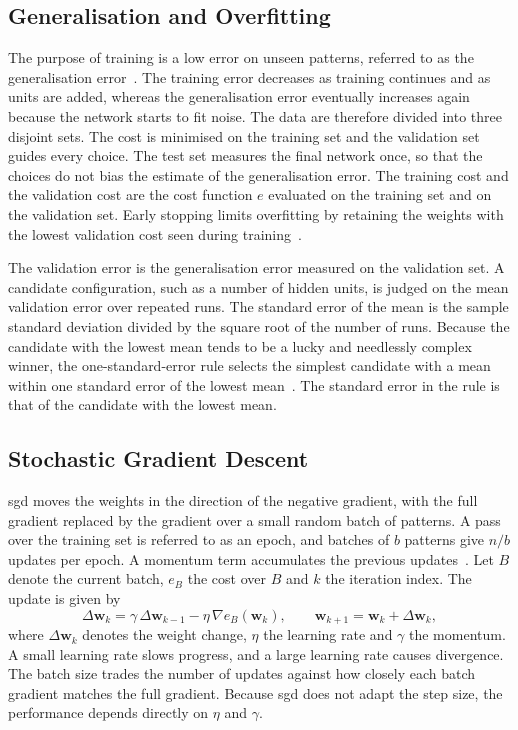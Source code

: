 \documentclass[conference]{IEEEtran}
\newcommand{\vect}[1]{\mathbf{#1}}
\begin{document}
\subsection{Generalisation and Overfitting}

The purpose of training is a low error on unseen patterns, referred to as the
generalisation error~\cite{engelbrecht2007}. The training error decreases as
training continues and as units are added, whereas the generalisation error
eventually increases again because the network starts to fit noise. The data are
therefore divided into three disjoint sets. The cost is minimised on the training
set and the validation set guides every choice. The test set measures the final
network once, so that the choices do not bias the estimate of the generalisation
error. The training cost and
the validation cost are the cost function $e$ evaluated on the training set and on
the validation set. Early stopping limits overfitting by retaining the weights with the
lowest validation cost seen during training~\cite{prechelt1998}.

The validation error is the generalisation error measured on the validation
set. A candidate configuration, such as a number of hidden units, is judged on the
mean validation error over repeated runs. The standard error of the mean is the sample
standard deviation divided by the square root of the number of runs. Because
the candidate with the lowest mean tends to be a lucky and needlessly complex
winner, the one-standard-error rule selects the simplest candidate with a mean
within one standard error of the lowest mean~\cite{hastie2009}. The standard
error in the rule is that of the candidate with the lowest mean.

\subsection{Stochastic Gradient Descent}

\Gls{sgd} moves the weights in the direction of the negative gradient, with the
full gradient replaced by the gradient over a small random batch of patterns. A pass over the training set is referred to as an
epoch, and batches of $b$ patterns give $n/b$ updates per epoch. A momentum term
accumulates the previous updates~\cite{polyak1964,rumelhart1986}. Let $B$ denote
the current batch, $e_B$ the cost over $B$ and $k$ the iteration index. The update
is given by
\begin{equation}
\Delta\vect{w}_k = \gamma \, \Delta\vect{w}_{k-1} - \eta \, \nabla e_B(\vect{w}_k),
\qquad \vect{w}_{k+1} = \vect{w}_k + \Delta\vect{w}_k,
\end{equation}
where $\Delta\vect{w}_k$ denotes the weight change, $\eta$ the learning rate and
$\gamma$ the momentum. A small learning rate slows progress, and a large learning
rate causes divergence. The batch size trades the number of updates against how closely each batch
gradient matches the full gradient.
Because \gls{sgd} does not adapt the step size, the performance depends directly
on $\eta$ and $\gamma$.
\end{document}
